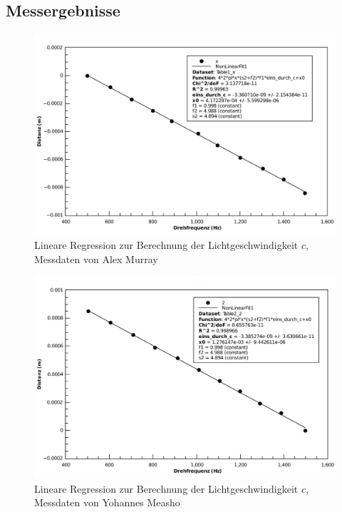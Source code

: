 \subsection{Messergebnisse}

\begin{figure}[H]
    \center
    \includegraphics[width=.8\textwidth]{images/am-f-x-fit-c.pdf}
    \caption{Lineare Regression zur Berechnung der Lichtgeschwindigkeit $c$, Messdaten von Alex Murray}
    \label{fig:am-f-x-fit-c}
\end{figure}



\begin{figure}[H]
    \center
    \includegraphics[width=.8\textwidth]{images/ym-f-x-fit-c.pdf}
    \caption{Lineare Regression zur Berechnung der Lichtgeschwindigkeit $c$, Messdaten von Yohannes Measho}
    \label{fig:ym-f-x-fit-c}
\end{figure}

